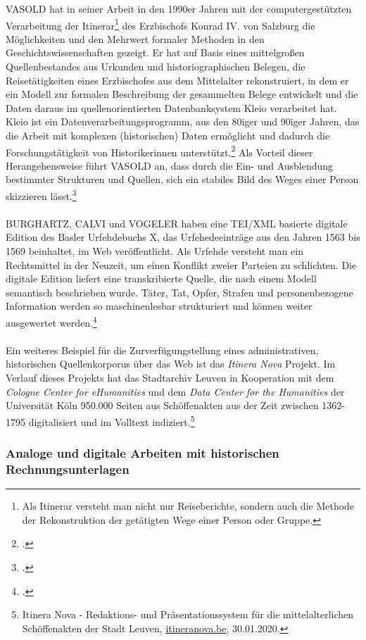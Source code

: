 \documentclass[12pt,a4paper]{article}
\begin{document}
VASOLD hat in seiner Arbeit in den 1990er Jahren mit der computergestützten Verarbeitung der Itinerar\footnote{Als Itinerar versteht man nicht nur Reiseberichte, sondern auch die Methode der Rekonstruktion der getätigten Wege einer Person oder Gruppe.} des Erzbischofs Konrad IV. von Salzburg die Möglichkeiten und den Mehrwert formaler Methoden in den Geschichtswissenschaften gezeigt. Er hat auf Basis eines mittelgroßen Quellenbestandes aus Urkunden und historiographischen Belegen, die Reisetätigkeiten eines Erzbischofes aus dem Mittelalter rekonstruiert, in dem er ein Modell zur formalen Beschreibung der gesammelten Belege entwickelt und die Daten daraus im quellenorientierten Datenbanksystem Kleio verarbeitet hat. Kleio ist ein Datenverarbeitungsprogramm, aus den 80iger und 90iger Jahren, das die Arbeit mit komplexen (historischen) Daten ermöglicht und dadurch die Forschungstätigkeit von Historikerinnen unterstützt.\footcite[][S.172-174]{hoffmann1990ehepaare}  Als Vorteil dieser Herangehensweise führt VASOLD an, dass durch die Ein- und Ausblendung bestimmter Strukturen und Quellen, sich ein stabiles Bild des Weges einer Person skizzieren lässt.\footcite{vasold1996itinerar}
\\
\\
BURGHARTZ, CALVI und VOGELER haben eine TEI/XML basierte digitale Edition des Basler Urfehdebuchs X, das Urfehedeeinträge aus den Jahren 1563 bis 1569 beinhaltet, im Web veröffentlicht. Als Urfehde versteht man ein Rechtsmittel in der Neuzeit, um einen Konflikt zweier Parteien zu schlichten. Die digitale Edition liefert eine transkribierte Quelle, die nach einem Modell semantisch beschrieben wurde. Täter, Tat, Opfer, Strafen und personenbezogene Information werden so maschinenlesbar strukturiert und können weiter ausgewertet werden.\footcite[][S.27-29]{pollin2017semantically} 
\\
\\
Ein weiteres Beispiel für die Zurverfügungstellung eines administrativen, historischen Quellenkorporus über das Web ist das \textit{Itinera Nova} Projekt. Im Verlauf dieses Projekts hat das Stadtarchiv Leuven in Kooperation mit dem \textit{Cologne Center for eHumanities} und dem \textit{Data Center for the Humanities} der Universität Köln 950.000 Seiten aus Schöffenakten aus der Zeit zwischen 1362-1795 digitalisiert und im Volltext indiziert.\footnote{Itinera Nova - Redaktions- und Präsentationssystem für die mittelalterlichen Schöffenakten der Stadt Leuven, \url{itineranova.be}, 30.01.2020.}

\subsubsection{Analoge und digitale Arbeiten mit historischen Rechnungsunterlagen}
\end{document}
